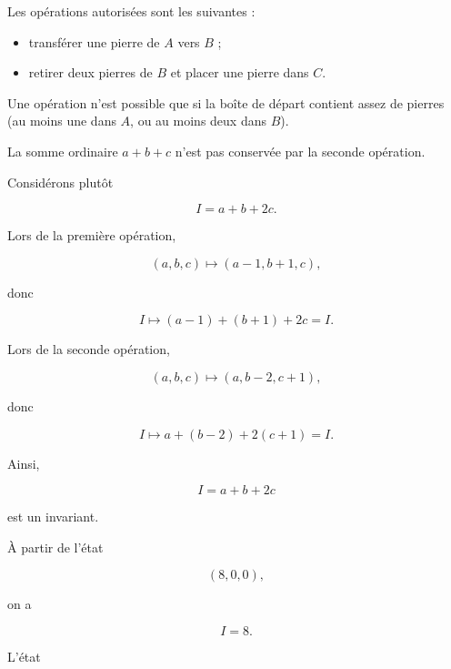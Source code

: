 Les opérations autorisées sont les suivantes :

\begin{itemize}
    \item transférer une pierre de \(A\) vers \(B\) ;
    \item retirer deux pierres de \(B\) et placer une pierre dans \(C\).
\end{itemize}

Une opération n'est possible que si la boîte de départ contient assez de
pierres (au moins une dans \(A\), ou au moins deux dans \(B\)).

\begin{center}
\end{center}

La somme ordinaire \(a+b+c\) n'est pas conservée par la seconde opération.

Considérons plutôt

\[
I=a+b+2c.
\]

Lors de la première opération,

\[
(a,b,c)\longmapsto(a-1,b+1,c),
\]

donc

\[
I\longmapsto(a-1)+(b+1)+2c=I.
\]

Lors de la seconde opération,

\[
(a,b,c)\longmapsto(a,b-2,c+1),
\]

donc

\[
I\longmapsto a+(b-2)+2(c+1)=I.
\]

Ainsi,

\[
\boxed{I=a+b+2c}
\]

est un invariant.

À partir de l'état

\[
(8,0,0),
\]

on a

\[
I=8.
\]

L'état

